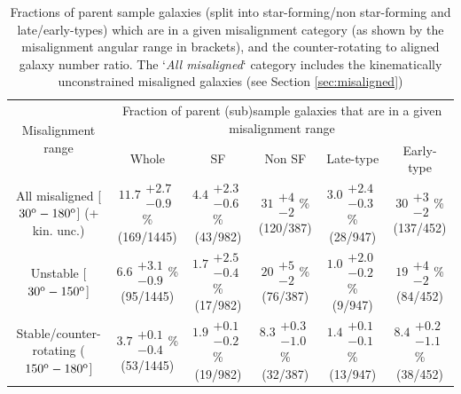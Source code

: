 \documentclass[fleqn,usenatbib]{mnras}
\begin{document}
\setlength{\tabcolsep}{4.4pt} 
\renewcommand{\arraystretch}{1.1}
\begin{table}
\centering
\caption{Fractions of parent sample galaxies (split into star-forming/non star-forming and late/early-types) which are in a given misalignment category (as shown by the misalignment angular range in brackets), and the counter-rotating to aligned galaxy number ratio. The `\textit{All misaligned}` category includes the kinematically unconstrained misaligned galaxies (see Section \ref{sec:misaligned}) }\label{tab:TableA1}
\begin{tabular*}{\textwidth}{@{\extracolsep{\fill}}cccccc} 
\hline\multirow{2}{*}{Misalignment range} & \multicolumn{5}{c}{Fraction of parent (sub)sample galaxies that are in a given misalignment range} \\
                             & Whole          & SF          & Non SF          & Late-type          & Early-type         \\
\hline
All misaligned [$30^{\rm{o}}-180^{\rm{o}}$] (+ kin. unc.)              &       $11.7\substack{+2.7 \\ -0.9}$\% (169/1445)         &    $4.4\substack{+2.3 \\ -0.6}$\% (43/982)          &   $31\substack{+4 \\ -2}$\% (120/387)               &     $3.0\substack{+2.4 \\ -0.3}$\% (28/947)                &       $30\substack{+3 \\ -2}$\% (137/452)              \\
Unstable [$30^{\rm{o}}-150^{\rm{o}}$]                     & $6.6\substack{+3.1 \\ -0.9}$\% (95/1445)                &   $1.7\substack{+2.5 \\ -0.4}$\% (17/982)           &    $20\substack{+5 \\ -2}$\% (76/387)              &       $1.0\substack{+2.0 \\ -0.2}$\% (9/947)              &        $19\substack{+4 \\ -2}$\% (84/452)                  \\
Stable/counter-rotating ($150^{\rm{o}}-180^{\rm{o}}$]     & $3.7\substack{+0.1 \\ -0.4}$\% (53/1445) &           $1.9\substack{+0.1 \\ -0.2}$\% (19/982)    &        $8.3\substack{+0.3 \\ -1.0}$\% (32/387)     &       $1.4\substack{+0.1 \\ -0.1}$\% (13/947)          &      $8.4\substack{+0.2 \\ -1.1}$\% (38/452)                        \\         


\end{tabular*}
\end{table}
\end{document}
